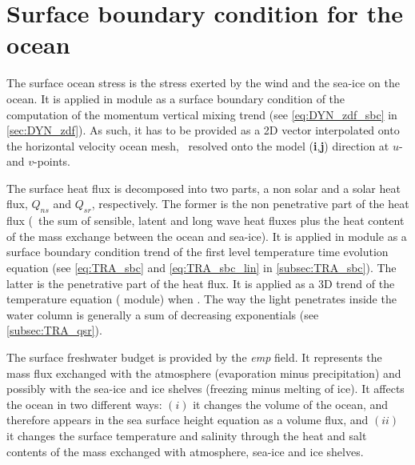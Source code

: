 \documentclass[../main/NEMO_manual]{subfiles}
\begin{document}
\section{Surface boundary condition for the ocean}
\label{sec:SBC_ocean}

The surface ocean stress is the stress exerted by the wind and the sea-ice on the ocean.
It is applied in  module as a surface boundary condition of the computation of
the momentum vertical mixing trend (see \autoref{eq:DYN_zdf_sbc} in \autoref{sec:DYN_zdf}).
As such, it has to be provided as a 2D vector interpolated onto the horizontal velocity ocean mesh,
\ie\ resolved onto the model (\textbf{i},\textbf{j}) direction at $u$- and $v$-points.

The surface heat flux is decomposed into two parts, a non solar and a solar heat flux,
$Q_{ns}$ and $Q_{sr}$, respectively.
The former is the non penetrative part of the heat flux
(\ie\ the sum of sensible, latent and long wave heat fluxes plus
the heat content of the mass exchange between the ocean and sea-ice).
It is applied in  module as a surface boundary condition trend of
the first level temperature time evolution equation
(see \autoref{eq:TRA_sbc} and \autoref{eq:TRA_sbc_lin} in \autoref{subsec:TRA_sbc}).
The latter is the penetrative part of the heat flux.
It is applied as a 3D trend of the temperature equation ( module) when
.
The way the light penetrates inside the water column is generally a sum of decreasing exponentials
(see \autoref{subsec:TRA_qsr}).

The surface freshwater budget is provided by the \textit{emp} field.
It represents the mass flux exchanged with the atmosphere (evaporation minus precipitation) and
possibly with the sea-ice and ice shelves (freezing minus melting of ice).
It affects the ocean in two different ways:
$(i)$  it changes the volume of the ocean, and therefore appears in the sea surface height equation as		%
a volume flux, and
$(ii)$ it changes the surface temperature and salinity through the heat and salt contents of
the mass exchanged with atmosphere, sea-ice and ice shelves.

\end{document}
